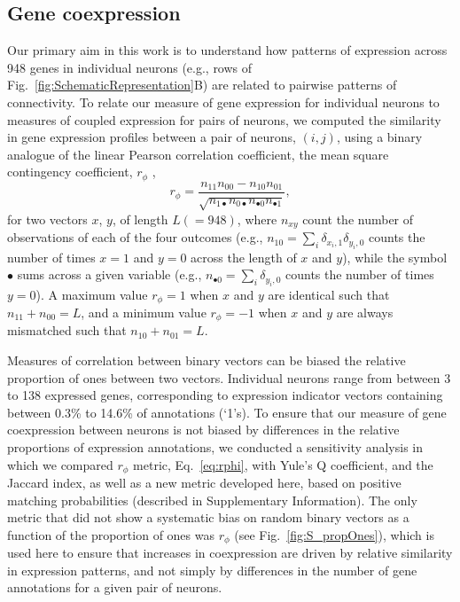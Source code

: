 \documentclass[10pt,letterpaper]{article}
\begin{document}
\subsection*{Gene coexpression}
Our primary aim in this work is to understand how patterns of expression across 948 genes in individual neurons (e.g., rows of Fig.~\ref{fig:SchematicRepresentation}B) are related to pairwise patterns of connectivity.
To relate our measure of gene expression for individual neurons to measures of coupled expression for pairs of neurons, we computed the similarity in gene expression profiles between a pair of neurons, $(i,j)$, using a binary analogue of the linear Pearson correlation coefficient, the mean square contingency coefficient, $r_\phi$ \cite{Warrens2008},
\begin{equation} \label{eq:rphi}
    r_\phi = \frac{n_{11}n_{00} - n_{10}n_{01}}{\sqrt{n_{1\bullet}n_{0\bullet}n_{\bullet 0}n_{\bullet 1}}},
\end{equation}
for two vectors $x$, $y$, of length $L(=948)$, where $n_{xy}$ count the number of observations of each of the four outcomes (e.g., $n_{10} = \sum_i \delta_{x_i,1}\delta_{y_i,0}$ counts the number of times $x=1$ and $y=0$ across the length of $x$ and $y$), while the symbol $\bullet$ sums across a given variable (e.g., $n_{\bullet 0} = \sum_i \delta_{y_i,0}$ counts the number of times $y = 0$).
A maximum value $r_\phi = 1$ when $x$ and $y$ are identical such that $n_{11} + n_{00} = L$, and a minimum value $r_\phi = -1$ when $x$ and $y$ are always mismatched such that $n_{10} + n_{01} = L$.

Measures of correlation between binary vectors can be biased the relative proportion of ones between two vectors.
Individual neurons range from between 3 to 138 expressed genes, corresponding to expression indicator vectors containing between 0.3\% to 14.6\% of annotations (`1's).
To ensure that our measure of gene coexpression between neurons is not biased by differences in the relative proportions of expression annotations, we conducted a sensitivity analysis in which we compared $r_\phi$ metric, Eq.~\eqref{eq:rphi}, with Yule's Q coefficient, and the Jaccard index, as well as a new metric developed here, based on positive matching probabilities (described in Supplementary Information).
The only metric that did not show a systematic bias on random binary vectors as a function of the proportion of ones was $r_\phi$ (see Fig.~\ref{fig:S_propOnes}), which is used here to ensure that increases in coexpression are driven by relative similarity in expression patterns, and not simply by differences in the number of gene annotations for a given pair of neurons.
\end{document}
